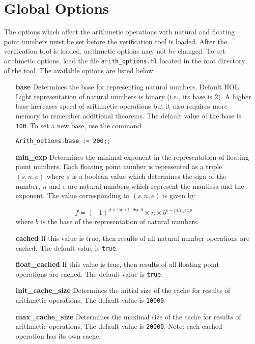 \documentclass[a4paper]{article}
\begin{document}
\section{Global Options}\label{global}
The options which affect the arithmetic operations with natural and floating point numbers must be set before the verification tool is loaded. After the verification tool is loaded, arithmetic options may not be changed. To set arithmetic options, load the file \verb|arith_options.hl| located in the root directory of the tool. The available options are listed below.

\begin{enumerate}
\item[\bf base] Determines the base for representing natural numbers. Default HOL Light
representation of natural numbers is binary (i.e., its base is 2). A higher base increases speed of arithmetic operations but it also requires more memory to remember additional theorems. The default value of the base is \verb|100|. To set a new base, use the command

\verb|Arith_options.base := 200;;|

\item[\bf min\_exp] Determines the minimal exponent in the representation of floating point numbers. Each floating point number is represented as a triple $(s, n, e)$ where $s$ is a boolean value which determines the sign of the number, $n$ and $e$ are natural numbers which represent the mantissa and the exponent. The value corresponding to $(s, n, e)$ is given by

\[f = (-1)^{\text{if $s$ then $1$ else $0$}} \times n \times b^{e - min\_exp}\]
where $b$ is the base of the representation of natural numbers.

\item[\bf cached] If this value is true, then results of all natural number operations are cached. The default value is \verb|true|.

\item[\bf float\_cached] If this value is true, then results of all floating point operations are cached. The default value is \verb|true|.

\item[\bf init\_cache\_size] Determines the initial size of the cache for results of arithmetic operations. The default value is \verb|10000|.

\item[\bf max\_cache\_size] Determines the maximal size of the cache for results of arithmetic operations. The default value is \verb|20000|. Note: each cached operation has its own cache.

\end{enumerate}
\end{document}
